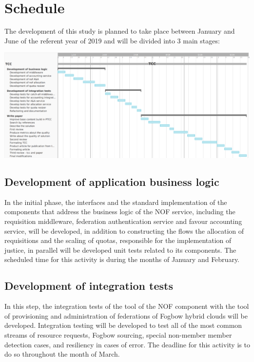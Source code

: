 \documentclass{article}
\begin{document}
\section{Schedule}

The development of this study is planned to take place between January and June of the referent year of 2019 and will be divided into 3 main stages:

\begin{center}
\includegraphics[scale=0.35]{./image/TCC-schedule.png}
\end{center}

\subsection{Development of application business logic}
	In the initial phase, the interfaces and the standard implementation of the components that address the business logic of the NOF service, including the requisition middleware, federation authentication service and favour accounting service, will be developed, in addition to constructing the flows the allocation of requisitions and the scaling of quotas, responsible for the implementation of justice, in parallel will be developed unit tests related to its components. The scheduled time for this activity is during the months of January and February.
\subsection{Development of integration tests}
    In this step, the integration tests of the tool of the NOF component with the tool of provisioning and administration of federations of Fogbow hybrid clouds will be developed. Integration testing will be developed to test all of the most common streams of resource requests, Fogbow sourcing, special non-member member detection cases, and resiliency in cases of error. The deadline for this activity is to do so throughout the month of March.
\end{document}
